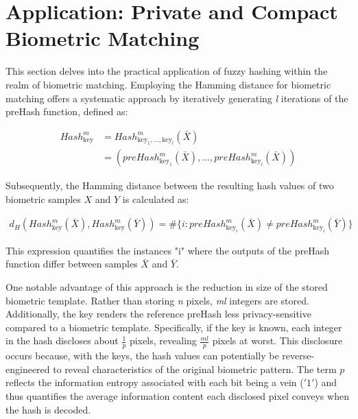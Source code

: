 \newpage
\section{Application: Private and Compact Biometric Matching}
\label{Application: Private and Compact Biometric Matching}

This section delves into the practical application of fuzzy hashing within the realm of biometric matching. Employing the Hamming distance for biometric matching offers a systematic approach by iteratively generating \textit{l} iterations of the preHash function, defined as:

\begin{equation}
    \begin{aligned}
        Hash_{\text{key}}^m &= Hash_{\text{key}_1, \ldots, \text{key}_l}^m(\bar{X})\\
        &= (preHash_{\text{key}_1}^m(\bar{X}), \ldots, preHash_{\text{key}_l}^m(\bar{X}))
    \end{aligned}
\end{equation}

Subsequently, the Hamming distance between the resulting hash values of two biometric samples \(X\) and \(Y\) is calculated as:

\begin{equation}
    \begin{aligned}
        \label{eq:HammingDist}
        d_H(Hash_{\text{key}}^m(\bar{X}), Hash_{\text{key}}^m(\bar{Y})) = \# \{i: preHash_{\text{key}_i}^m(\bar{X}) \neq preHash_{\text{key}_i}^m(\bar{Y})\}
    \end{aligned}
\end{equation}

This expression quantifies the instances "i" where the outputs of the preHash function differ between samples \(\bar{X}\) and \(\bar{Y}\).

One notable advantage of this approach is the reduction in size of the stored biometric template. Rather than storing \textit{n} pixels, \textit{ml} integers are stored. Additionally, the key renders the reference preHash less privacy-sensitive compared to a biometric template. Specifically, if the key is known, each integer in the hash discloses about \(\frac{1}{p}\) pixels, revealing \(\frac{ml}{p}\) pixels at worst. This disclosure occurs because, with the keys, the hash values can potentially be reverse-engineered to reveal characteristics of the original biometric pattern. The term \(p\)​ reflects the information entropy associated with each bit being a vein (\('1'\)) and thus quantifies the average information content each disclosed pixel conveys when the hash is decoded.

